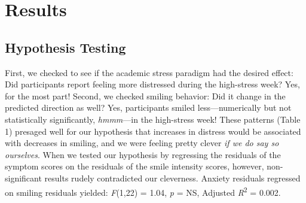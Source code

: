 \documentclass[authordate, empirical]{jote-new-article}
\begin{document}





\section{Results}







\subsection{Hypothesis Testing}



First, we checked to see if the academic stress paradigm had the desired effect: Did participants report feeling more distressed during the high-stress week? Yes, for the most part! Second, we checked smiling behavior: Did it change in the predicted direction as well? Yes, participants smiled less—numerically but not statistically significantly, \emph{hmmm}—in the high-stress week! These patterns (Table 1) presaged well for our hypothesis that increases in distress would be associated with decreases in smiling, and we were feeling pretty clever \emph{if we do say so ourselves}. When we tested our hypothesis by regressing the residuals of the symptom scores on the residuals of the smile intensity scores, however, non-significant results rudely contradicted our cleverness. Anxiety residuals regressed on smiling residuals yielded: \emph{F}(1,22) = 1.04, \emph{p} = NS, Adjusted \emph{R}\textsuperscript{2} = 0.002.
\end{document}
